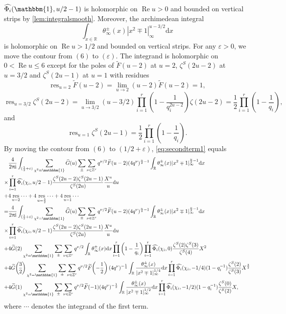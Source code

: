 \documentclass[10pt,oneside,reqno]{amsart}
\makeatletter
\newcommand\rmd{\mathrm{d}}
\newcommand\rmi{\mathrm{i}}
\newcommand\RR{\mathbb{R}}
\newcommand\ZZ{\mathbb{Z}}
\newcommand\triv{\mathbbm{1}}
\newcommand\dpii{2\uppi\rmi}
\renewcommand\Re{\mathop{\mathrm{Re}}}
\DeclareMathOperator\res{res}
\renewcommand\leq{\leqslant}
\newcommand\legendresymbol[2]{\genfrac{(}{)}{}{}{#1}{#2}}
\theoremstyle{THEOREM}
\theoremstyle{DEFINITION}
\theoremstyle{EXERCISE}
\numberwithin{equation}{section}
\renewenvironment{proof}[1][\proofname]{\par
  \vspace{-6pt}
  \pushQED{\qed}
  \normalfont \topsep6\p@\@plus6\p@\relax
  \trivlist
  \item[\hskip\labelsep\rmfamily\bfseries
    #1\@addpunct{:}]\ignorespaces
}{
  \popQED\endtrivlist\@endpefalse
  \vspace{-6pt}
}
\makeatother
\begin{document}
\begin{proof}
$\widehat{\Phi_i}(\triv,u/2-1)$ is holomorphic on $\Re u>0$ and bounded on vertical strips by \autoref{lem:integralsmooth}. Moreover, the archimedean integral
\[
\int_{x\in\RR}\theta_\infty^\pm(x)|x^2\mp 1|_\infty^{u-3/2}\rmd x
\]
is holomorphic on $\Re u>1/2$ and bounded on vertical strips. For any $\varepsilon>0$, we move the contour from $(6)$ to $(\varepsilon)$. The integrand is holomorphic on $0<\Re u\leq 6$ except for the poles of $\widetilde{F}(u-2)$ at $u=2$, $\zeta^S(2u-2)$ at $u=3/2$ and $\zeta^{S}(2u-1)$ at $u=1$ with residues
\[
\res_{u=2}\widetilde{F}(u-2)=\lim_{u\to 2}(u-2)\widetilde{F}(u-2)=1,
\]
\[
\res_{u=3/2}\zeta^S(2u-2)=\lim_{u\to 3/2}(u-3/2)\prod_{i=1}^{r}\left(1-\frac{1}{q_i^{2u-2}}\right) \zeta(2u-2)=\frac{1}{2}\prod_{i=1}^{r}\left(1-\frac{1}{q_i}\right),
\]
and
\[
\res_{u=1}\zeta^S(2u-1)=\frac{1}{2}\prod_{i=1}^{r}\left(1-\frac{1}{q_i}\right).
\]
By moving the contour from $(6)$ to $(1/2+\varepsilon)$, \eqref{eq:secondterm1} equals
\begin{align*}
&\frac{4}{\dpii}\int_{(\frac12+\varepsilon)}\sum_{\chi^2=\triv}\widehat{G}(u)\sum_{\pm}\sum_{\nu\in \ZZ^r}q^{\nu/2}\widetilde{F}(u-2)(4q^\nu)^{\frac u2-1}\int_{\RR}\theta_\infty^\pm(x)|x^2\mp 1|_\infty^{\frac u2-1}\rmd x\\
\times&\prod_{i=1}^{r}\widehat{\Phi_i}(\chi_i,u/2-1) \frac{\zeta^S(2u-2)\zeta^S(2u-1)}{\zeta^S(2u)}\frac{X^u}{u}\rmd u\\
+&4\res_{u=2}\cdots+4\res_{u=\frac{3}{2}}\cdots+4\res_{u=1}\cdots\\
=&\frac{4}{\dpii}\int_{(\frac12+\varepsilon)}\sum_{\chi^2=\triv}\widehat{G}(u)\sum_{\pm}\sum_{\nu\in \ZZ^r}q^{\nu/2}\widetilde{F}(u-2)(4q^\nu)^{\frac u2-1}\int_{\RR}\theta_\infty^\pm(x)|x^2\mp 1|_\infty^{\frac u2-1}\rmd x\\
\times&\prod_{i=1}^{r}\widehat{\Phi_i}(\chi_i,u/2-1) \frac{\zeta^S(2u-2)\zeta^S(2u-1)}{\zeta^S(2u)}\frac{X^u}{u}\rmd u\\
+&4\widetilde{G}(2)\sum_{\chi^2=\triv}\sum_{\pm}\sum_{\nu\in \ZZ^r}q^{\nu/2}\int_{\RR}\theta_\infty^\pm(x)\rmd x\prod_{i=1}^{r}\left(1-\frac{1}{q_i}\right)\prod_{i=1}^{r}\widehat{\Phi_i}(\chi_i,0) \frac{\zeta^S(2)\zeta^S(3)}{\zeta^S(4)}X^2\\
+&4\widetilde{G}\legendresymbol{3}{2}\sum_{\chi^2=\triv}\sum_{\pm}\sum_{\nu\in \ZZ^r}q^{\nu/2}\widetilde{F}\!\left(-\frac12\right)(4q^\nu)^{-\frac14} \int_{\RR}\frac{\theta_\infty^\pm(x)}{|x^2\mp 1|_\infty^{1/4}}\rmd x\prod_{i=1}^{r}\widehat{\Phi_i}(\chi_i,-1/4)(1-q_i^{-1}) \frac{\zeta^S(2)}{\zeta^S(3)}X^{\frac32}\\
+&4\widetilde{G}(1)\sum_{\chi^2=\triv}\sum_{\pm}\sum_{\nu\in \ZZ^r}q^{\nu/2}\widetilde{F}(-1)(4q^\nu)^{-\frac12}\int_{\RR}\frac{\theta_\infty^\pm(x)}{|x^2\mp 1|_\infty^{1/2}}\rmd x\prod_{i=1}^{r}\widehat{\Phi_i}(\chi_i,-1/2)(1-q_i^{-1}) \frac{\zeta^S(0)}{\zeta^S(2)}X,
\end{align*}
where $\cdots$ denotes the integrand of the first term.


\end{proof}
\end{document}
